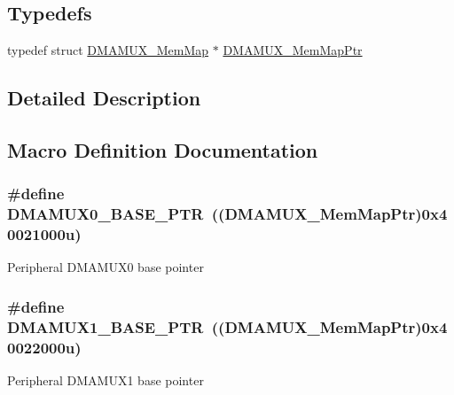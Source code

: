 \subsection*{Typedefs}
\begin{DoxyCompactItemize}
\item 
typedef struct \hyperlink{struct_d_m_a_m_u_x___mem_map}{D\+M\+A\+M\+U\+X\+\_\+\+Mem\+Map} $\ast$ \hyperlink{group___d_m_a_m_u_x___peripheral_ga736ab5b1ed284b3b4fdb63010a576777}{D\+M\+A\+M\+U\+X\+\_\+\+Mem\+Map\+Ptr}
\end{DoxyCompactItemize}


\subsection{Detailed Description}


\subsection{Macro Definition Documentation}
\hypertarget{group___d_m_a_m_u_x___peripheral_ga403b61d306820e4e1113c636300004a3}{}
\subsubsection[{D\+M\+A\+M\+U\+X0\+\_\+\+B\+A\+S\+E\+\_\+\+P\+T\+R}]{\setlength{\rightskip}{0pt plus 5cm}\#define D\+M\+A\+M\+U\+X0\+\_\+\+B\+A\+S\+E\+\_\+\+P\+T\+R~(({\bf D\+M\+A\+M\+U\+X\+\_\+\+Mem\+Map\+Ptr})0x40021000u)}\label{group___d_m_a_m_u_x___peripheral_ga403b61d306820e4e1113c636300004a3}
Peripheral D\+M\+A\+M\+U\+X0 base pointer \hypertarget{group___d_m_a_m_u_x___peripheral_gad6b43366c6448bd157f17be565d8e1f3}{}
\subsubsection[{D\+M\+A\+M\+U\+X1\+\_\+\+B\+A\+S\+E\+\_\+\+P\+T\+R}]{\setlength{\rightskip}{0pt plus 5cm}\#define D\+M\+A\+M\+U\+X1\+\_\+\+B\+A\+S\+E\+\_\+\+P\+T\+R~(({\bf D\+M\+A\+M\+U\+X\+\_\+\+Mem\+Map\+Ptr})0x40022000u)}\label{group___d_m_a_m_u_x___peripheral_gad6b43366c6448bd157f17be565d8e1f3}
Peripheral D\+M\+A\+M\+U\+X1 base pointer \hypertarget{group___d_m_a_m_u_x___peripheral_gaad218c12978071501dc2899f0624de4b}{}
